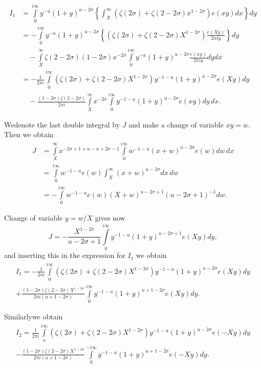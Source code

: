 \begin{align*}
  I_1 & = \int\limits_0^{i \infty} y^{-u} (1+ y)^{u- 2\sigma}
  \left\{\int^\infty_X (\zeta (2 \sigma) + \zeta (2 - 2 \sigma)x^{1-
    2\sigma}) e(xy) dx \right\}dy\\
  & = - \int\limits_0^{i \infty} y^{-u} (1+ y)^{u-2 \sigma}
  \left\{(\zeta(2\sigma) + \zeta (2-2\sigma)X^{1- 2\sigma})
  \frac{e(Xy)}{2 \pi i y} \right\}dy\\
  &\quad - \int\limits_X^{\infty} \zeta (2 - 2 \sigma)(1- 2 \sigma) x^{- 2
    \sigma} \int\limits_0^{i \infty} y^{- u}(1+ y)^{u- 2 \sigma}
  \frac{e(xy)}{2 \pi i y} dy dx\\
  & = -  \frac{1}{2 \pi i} \int\limits_0^{i \infty} \left( \zeta (2 \sigma) +
  \zeta (2- 2 \sigma) X^{1- 2 \sigma}  \right)
  y^{-1 -u}(1+ y)^{u-2\sigma} e(Xy) dy\\
  &\quad - \frac{(1- 2\sigma)\zeta (2- 2 \sigma)}{2 \pi i}
  \int\limits^\infty_X x^{- 2 \sigma} \int\limits_{0}^{i \infty} y^{-1
    -u} (1+ y)^{u- 2\sigma} e(xy)dy\, dx.
\end{align*}

We\pageoriginale denote the last double integral by $J$ and make a change of
variable $xy =w$. Then we obtain
\begin{align*}
  J & = \int\limits_X^\infty x^{- 2 \sigma + 1 + u - u + 2 \sigma-1}
  \int\limits_0^{i \infty} w^{-1 -u} (x+ w)^{u- 2 \sigma} e(w) dw\,
  dx\\
  & = \int\limits_0^{i \infty} w^{-1 -u} e(w) \int_X^\infty (x+ w)^{u
    -2 \sigma} dx\, dw\\
  & = - \int\limits_0^{i \infty} w^{-1 -u} e(w) (X+ w)^{u- 2 \sigma+1}
  (u - 2 \sigma + 1)^{-1} dw.
\end{align*}

Change of variable $y = w/X$ gives now
$$
J= - \frac{X^{1- 2 \sigma}}{u- 2 \sigma +1} \int\limits_0^{i \infty}
y^{-1 -u} (1+ y)^{u- 2 \sigma +1} e(Xy) dy,
$$
and inserting this in the expression for $I_1$ we obtain 
\begin{multline*}
  I_1 =- \frac{1}{2 \pi i} \int\limits_0^{i \infty} (\zeta (2 \sigma)
  + \zeta (2 - 2 \sigma) X^{1- 2 \sigma}) y^{-1 -u} (1+ y)^{u- 2
    \sigma} e(Xy) dy\\
  + \frac{(1- 2 \sigma) \zeta (2- 2 \sigma) X^{1- 2 \sigma}}{2 \pi i
    (u+ 1 - 2 \sigma)} \int\limits_0^{i \infty} y^{-1 -u} (1+
  y)^{u+1-2 \sigma} e(Xy) dy.
\end{multline*}

Similarly\pageoriginale we obtain
\begin{multline*}
  I_2 = \frac{1}{2 \pi i} \int\limits_o^{i \infty} (\zeta (2 \sigma) +
  \zeta (2- 2\sigma)X^{1- 2\sigma}) y^{-1 -u} (1+ y)^{u- 2 \sigma} e(-
  Xy) dy\\
  - \frac{(1- 2\sigma)\zeta (2- 2 \sigma)X^{1- 2 \sigma}}{2 \pi i (u +
    1- 2 \sigma)} \int\limits_0^{- i \infty} y^{-1 -u} (1+ y)^{u+1 - 2
  \sigma} e (- Xy)dy.
\end{multline*}

